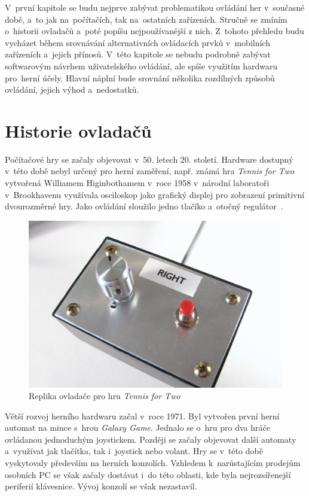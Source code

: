 \documentclass[thesis=B,czech,hidelinks]{FITthesis}[2012/06/26] %
\begin{document}
V~první kapitole se budu nejprve zabývat problematikou ovládání her v~současné době, a~to jak na~počítačích, tak na~ostatních zařízeních. Stručně se zmíním o~historii ovladačů a~poté popíšu nejpoužívanější z nich. Z~tohoto přehledu budu vycházet během srovnávání alternativních ovládacích prvků v~mobilních zařízeních a~jejich přínosů. V~této kapitole se nebudu podrobně zabývat softwarovým návrhem uživatelského ovládání, ale spíše využitím hardwaru pro~herní účely. Hlavní náplní bude srovnání několika rozdílných způsobů ovládání, jejich výhod a~nedostatků.

\section{Historie ovladačů}

Počítačové hry se začaly objevovat v~50. letech 20. století. Hardware dostupný v~této době nebyl určený pro herní zaměření, např. známá hra \textit{Tennis for Two} vytvořená Williamem Higinbothamem v~roce 1958 v~národní laboratoři v~Brookhavenu využívala osciloskop jako grafický displej pro zobrazení primitivní dvourozměrné hry. Jako ovládání sloužilo jedno tlačíko a~otočný regulátor~\cite{gamevshardware}.

\begin{figure}
\center
\includegraphics[width=\textwidth/2]{first_controller}
\caption{Replika ovladače pro hru \textit{Tennis for Two}\cite{gamevshardware}}
\end{figure}

\newpage

Větší rozvoj herního hardwaru začal v~roce 1971. Byl vytvořen první herní automat na mince s~hrou \textit{Galaxy Game}. Jednalo se o~hru pro dva hráče ovládanou jednoduchým joystickem. Později se začaly objevovat další automaty a~využívat jak tlačítka, tak i~joystick nebo volant. Hry se v~této době vyskytovaly především na herních konzolích. Vzhledem k~narůstajícím prodejům osobních PC se však začaly dostávat i~do této oblasti, kde byla nejrozsířenejší periferií klávesnice. Vývoj konzolí se však nezastavil.
\end{document}
